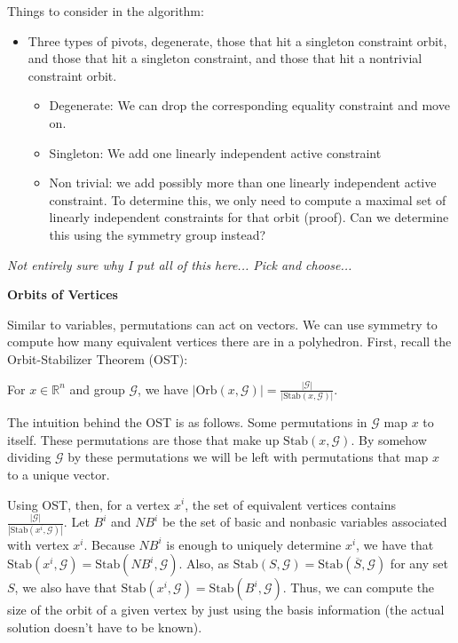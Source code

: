 \documentclass[runningheads]{llncs}
\newcommand{\cG}{{\mathcal G}}
\begin{document}
    Things to consider in the algorithm:
    \begin{itemize}
    \item Three types of pivots, degenerate, those that hit a singleton
      constraint orbit, and those that hit a singleton constraint, and those
      that hit a nontrivial constraint orbit.
      \begin{itemize}
      \item Degenerate: We can drop the corresponding equality constraint and
        move on.
      \item Singleton: We add one linearly independent active constraint
        \item Non trivial: we add possibly more than one linearly independent
          active constraint. To determine this, we only need to compute a
          maximal set of linearly independent constraints for that orbit
          (proof). Can we determine this using the symmetry group instead?
      \end{itemize}
      \end{itemize}
      


{\em Not entirely sure why I put all of this here... Pick and choose...}


{\bf Orbits of Vertices}

Similar to variables, permutations can act on vectors. We can use symmetry to
compute how many equivalent vertices there are in a polyhedron. First, recall
the Orbit-Stabilizer Theorem (OST):

\begin{theorem}
For $x \in \mathbb{R}^n$ and group $\cG$, we have $|\mbox{Orb}(x,\cG)| = \frac{ |\cG|}{|\mbox{Stab}(x,\cG)|}$.
  \end{theorem}

The intuition behind the OST is as follows. Some
permutations in $\cG$ map $x$ to itself. These permutations are those that make
up $\mbox{Stab}(x,\cG)$. By somehow dividing $\cG$ by these permutations we will
be left with permutations that map $x$ to a unique vector.

Using OST, then, for a vertex $x^i$, the set of equivalent vertices contains
$\frac{ |\cG|}{|\mbox{Stab}(x^i,\cG)|}$. Let $B^i$ and $NB^i$ be the set of
basic and nonbasic variables associated with vertex $x^i$. Because $NB^i$ is
enough to uniquely determine $x^i$, we have that $\mbox{Stab}(x^i,\cG) =
\mbox{Stab}(NB^i,\cG)$. Also, as $\mbox{Stab}(S,\cG) =
\mbox{Stab}(\overline{S},\cG)$ for any set $S$, we also have that $\mbox{Stab}(x^i,\cG) =
\mbox{Stab}(B^i,\cG)$. Thus, we can compute the size of the orbit of a given
vertex by just using the basis information (the actual solution doesn't have to
be known). 
\end{document}
